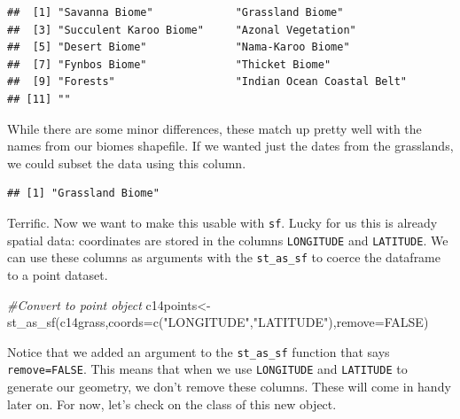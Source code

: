 \documentclass[
]{book}
\newenvironment{Shaded}{\begin{snugshade}}{\end{snugshade}}
\newcommand{\AttributeTok}[1]{\textcolor[rgb]{0.77,0.63,0.00}{#1}}
\newcommand{\CommentTok}[1]{\textcolor[rgb]{0.56,0.35,0.01}{\textit{#1}}}
\newcommand{\ConstantTok}[1]{\textcolor[rgb]{0.00,0.00,0.00}{#1}}
\newcommand{\FunctionTok}[1]{\textcolor[rgb]{0.00,0.00,0.00}{#1}}
\newcommand{\NormalTok}[1]{#1}
\newcommand{\OtherTok}[1]{\textcolor[rgb]{0.56,0.35,0.01}{#1}}
\newcommand{\SpecialCharTok}[1]{\textcolor[rgb]{0.00,0.00,0.00}{#1}}
\newcommand{\StringTok}[1]{\textcolor[rgb]{0.31,0.60,0.02}{#1}}
\begin{document}
\begin{verbatim}
##  [1] "Savanna Biome"             "Grassland Biome"          
##  [3] "Succulent Karoo Biome"     "Azonal Vegetation"        
##  [5] "Desert Biome"              "Nama-Karoo Biome"         
##  [7] "Fynbos Biome"              "Thicket Biome"            
##  [9] "Forests"                   "Indian Ocean Coastal Belt"
## [11] ""
\end{verbatim}

While there are some minor differences, these match up pretty well with the names from our biomes shapefile. If we wanted just the dates from the grasslands, we could subset the data using this column.

\begin{Shaded}
\end{Shaded}

\begin{verbatim}
## [1] "Grassland Biome"
\end{verbatim}

Terrific. Now we want to make this usable with \texttt{sf}. Lucky for us this is already spatial data: coordinates are stored in the columns \texttt{LONGITUDE} and \texttt{LATITUDE}. We can use these columns as arguments with the \texttt{st\_as\_sf} to coerce the dataframe to a point dataset.

\begin{Shaded}
\begin{Highlighting}[]
\CommentTok{\#Convert to point object}
\NormalTok{c14points}\OtherTok{\textless{}{-}}\FunctionTok{st\_as\_sf}\NormalTok{(c14grass,}\AttributeTok{coords=}\FunctionTok{c}\NormalTok{(}\StringTok{"LONGITUDE"}\NormalTok{,}\StringTok{"LATITUDE"}\NormalTok{),}\AttributeTok{remove=}\ConstantTok{FALSE}\NormalTok{)}
\end{Highlighting}
\end{Shaded}

Notice that we added an argument to the \texttt{st\_as\_sf} function that says \texttt{remove=FALSE}. This means that when we use \texttt{LONGITUDE} and \texttt{LATITUDE} to generate our geometry, we don't remove these columns. These will come in handy later on. For now, let's check on the class of this new object.
\end{document}
